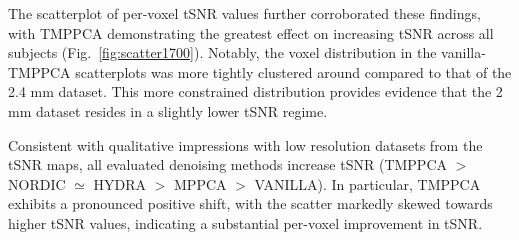 The scatterplot of per-voxel tSNR values further corroborated these findings, with TMPPCA demonstrating the greatest effect on increasing tSNR across all subjects (Fig.~\ref{fig:scatter1700}). Notably, the voxel distribution in the vanilla-TMPPCA scatterplots was more tightly clustered around compared to that of the 2.4 mm dataset. This more constrained distribution provides evidence that the 2 mm dataset resides in a slightly lower tSNR regime.

Consistent with qualitative impressions with low resolution datasets from the tSNR maps, all evaluated denoising methods increase tSNR (TMPPCA $>$ NORDIC $\simeq$ HYDRA $>$ MPPCA $>$ VANILLA). In particular, TMPPCA exhibits a pronounced positive shift, with the scatter markedly skewed towards higher tSNR values, indicating a substantial per-voxel improvement in tSNR.


